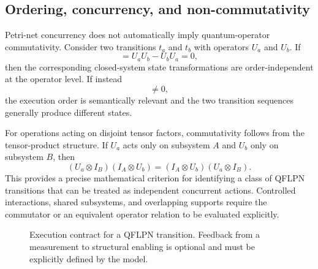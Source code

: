 \documentclass[final,3p,times]{elsarticle}
\begin{document}
\subsection{Ordering, concurrency, and non-commutativity}

Petri-net concurrency does not automatically imply quantum-operator commutativity. Consider two transitions $t_a$ and $t_b$ with operators $U_a$ and $U_b$. If
\begin{equation}
    [U_a,U_b]=U_aU_b-U_bU_a=0,
\end{equation}
then the corresponding closed-system state transformations are order-independent at the operator level. If instead
\begin{equation}
    [U_a,U_b]\neq0,
\end{equation}
the execution order is semantically relevant and the two transition sequences generally produce different states.

For operations acting on disjoint tensor factors, commutativity follows from the tensor-product structure. If $U_a$ acts only on subsystem $A$ and $U_b$ only on subsystem $B$, then
\begin{equation}
    (U_a\otimes I_B)(I_A\otimes U_b)
    =
    (I_A\otimes U_b)(U_a\otimes I_B).
\end{equation}
This provides a precise mathematical criterion for identifying a class of QFLPN transitions that can be treated as independent concurrent actions. Controlled interactions, shared subsystems, and overlapping supports require the commutator or an equivalent operator relation to be evaluated explicitly.

\begin{figure}[tbp]
    \centering
{}
    \caption{Execution contract for a QFLPN transition. Feedback from a measurement to structural enabling is optional and must be explicitly defined by the model.}
    \label{fig:qflpn-execution-contract}
\end{figure}
\end{document}
